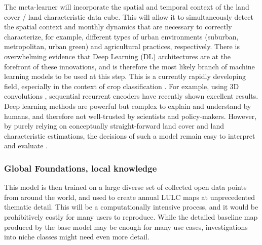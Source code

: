             The meta-learner will incorporate the spatial and temporal context of the land cover / land characteristic data cube. This will allow it to simultaneously detect the spatial context and monthly dynamics that are necessary to correctly characterize, for example, different types of urban environments (suburban, metropolitan, urban green) and agricultural practices, respectively.
            There is overwhelming evidence \citep{barriere2023boosting, russwurm2018multi, xu20183d, brown2022dynamic,xu2021towards} that Deep Learning (DL) architectures are at the forefront of these innovations, and is therefore the most likely branch of machine learning models to be used at this step.
            This is a currently rapidly developing field, especially in the context of crop classification \citep{barriere2023boosting}.  For example, using 3D convolutions \citep{xu20183d}, sequential recurrent encoders \citep{russwurm2018multi} have recently shown excellent results. Deep learning methods are powerful but complex to explain and understand by humans, and therefore not well-trusted by scientists and policy-makers. However, by purely relying on conceptually straight-forward land cover and land characteristic estimations, the decisions of such a model remain easy to interpret and evaluate \citep{ferchichi2022forecasting}.
    
        \subsubsection{Global Foundations, local knowledge}

            This model is then trained on a large diverse set of collected open data points from around the world, and used to create annual LULC maps at unprecedented thematic detail. This will be a computationally intensive process, and it would be prohibitively costly for many users to reproduce. 
            While the detailed baseline map produced by the base model may be enough for many use cases, investigations into niche classes might need even more detail.
            
